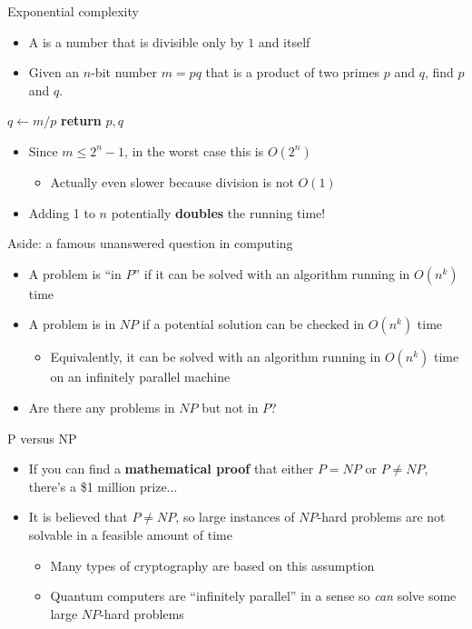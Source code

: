 \begin{frame}{Exponential complexity}
	\begin{itemize}
		\pause\item A  is a number that is divisible only by $1$ and itself
		\pause\item Given an $n$-bit number $m = pq$ that is a product of two primes $p$ and $q$, find $p$ and $q$.
	\end{itemize}
	\pause
	\begin{algorithmic}
			\State $q \gets m / p$
				\State \textbf{return} $p,q$
			\EndIf
		\EndFor
	\end{algorithmic}
	\begin{itemize}
		\pause\item Since $m \leq 2^n-1$, in the worst case this is $O(2^n)$
			\begin{itemize}
				\pause\item Actually even slower because division is not $O(1)$
			\end{itemize}
		\pause\item Adding 1 to $n$ potentially \textbf{doubles} the running time!
	\end{itemize}
\end{frame}

\begin{frame}{Aside: a famous unanswered question in computing}
	\begin{itemize}
		\pause\item A problem is ``in $P$'' if it can be solved with an
			algorithm running in $O(n^k)$ time
		\pause\item A problem is in $NP$ if a potential solution can be checked in $O(n^k)$ time
			\begin{itemize}
				\pause\item Equivalently, it can be solved with an algorithm running in $O(n^k)$ time on an infinitely parallel machine
			\end{itemize}
		\pause\item Are there any problems in $NP$ but not in $P$?
	\end{itemize}
\end{frame}

\begin{frame}{P versus NP}
	\begin{itemize}
		\pause\item If you can find a \textbf{mathematical proof} that either $P = NP$ or $P \neq NP$, there's a \$1 million prize...
		\pause\item It is believed that $P \neq NP$, so large instances of
			$NP$-hard problems are not solvable in a feasible amount of time
			\begin{itemize}
				\pause\item Many types of cryptography are based on this assumption
				\pause\item Quantum computers are ``infinitely parallel'' in a sense
					so \emph{can} solve some large $NP$-hard problems
			\end{itemize}
	\end{itemize}
\end{frame}


